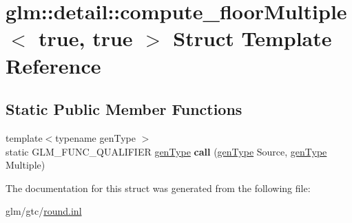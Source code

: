 \hypertarget{structglm_1_1detail_1_1compute__floorMultiple_3_01true_00_01true_01_4}{\section{glm\-:\-:detail\-:\-:compute\-\_\-floor\-Multiple$<$ true, true $>$ Struct Template Reference}
\label{structglm_1_1detail_1_1compute__floorMultiple_3_01true_00_01true_01_4}
}
\subsection*{Static Public Member Functions}
\begin{DoxyCompactItemize}
\item 
\hypertarget{structglm_1_1detail_1_1compute__floorMultiple_3_01true_00_01true_01_4_a18fef0ea82a4549501b832f4571ab1c5}{{\footnotesize template$<$typename gen\-Type $>$ }\\static G\-L\-M\-\_\-\-F\-U\-N\-C\-\_\-\-Q\-U\-A\-L\-I\-F\-I\-E\-R \hyperlink{structglm_1_1detail_1_1genType}{gen\-Type} {\bfseries call} (\hyperlink{structglm_1_1detail_1_1genType}{gen\-Type} Source, \hyperlink{structglm_1_1detail_1_1genType}{gen\-Type} Multiple)}\label{structglm_1_1detail_1_1compute__floorMultiple_3_01true_00_01true_01_4_a18fef0ea82a4549501b832f4571ab1c5}

\end{DoxyCompactItemize}


The documentation for this struct was generated from the following file\-:\begin{DoxyCompactItemize}
\item 
glm/gtc/\hyperlink{round_8inl}{round.\-inl}\end{DoxyCompactItemize}
